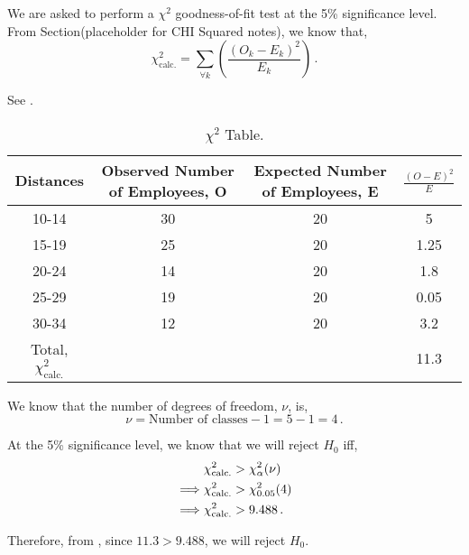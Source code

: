 \begin{subquestions}
\begin{subsubquestions}
\subsubquestion
We are asked to perform a $\chi^2$ goodness-of-fit test at the 5\% significance level. From Section(placeholder for CHI Squared notes), we know that,
\begin{equation}
	\chi^2_{\text{calc.}} = \sum_{\forall k} \left( \frac{(O_k-E_k)^2}{E_k}\right) \,.
\end{equation}

 See .
\begin{table}[H]
	\centering
	\begin{tabular}{|c|c|c|c|}
		\hline
		Distances & Observed Number of Employees, O & Expected Number of Employees, E & $\frac{(O-E)^2}{E}$\\
		\hline 
		10-14 & 30 & 20 & 5 \\
		15-19 & 25 & 20 & 1.25 \\
		20-24 & 14 & 20 & 1.8 \\
		25-29 & 19 & 20 & 0.05 \\
		30-34 & 12 & 20 & 3.2 \\
		\hline
		Total, $\chi^2_{\text{calc.}}$ & & & 11.3 \\
		\hline
	\end{tabular}
	\caption{\label{2010:q4:ChiTab} $\chi^2$ Table.}
\end{table}	

We know that the number of degrees of freedom, $\nu$, is,
\begin{equation}
	\nu = \text{Number of classes}-1 = 5-1 = 4\,.
\end{equation}

At the 5\% significance level, we know that we will reject $H_0$ iff,
\begin{align}
	&\chi^2_{\text{calc.}} > \chi^2_{\alpha}(\nu) \nonumber \\
	\implies & \chi^2_{\text{calc.}} > \chi^2_{0.05}(4) \nonumber \\
	\implies & \chi^2_{\text{calc.}} > 9.488 \,.
\end{align} 

Therefore, from , since $11.3>9.488$, we will reject $H_0$.
\end{subsubquestions}

\end{subquestions}
